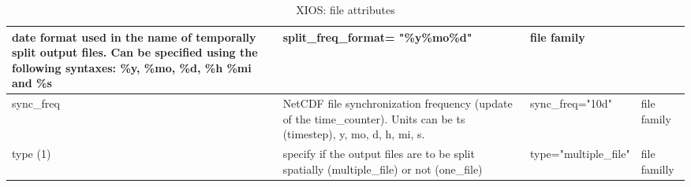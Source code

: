 \documentclass[../main/NEMO_manual]{subfiles}
\begin{document}
\begin{table}
\begin{tabularx}{\textwidth}{|l|X|l|l|}
    date format used in the name of temporally split output files.
    Can be specified using the following syntaxes: \%y, \%mo, \%d, \%h \%mi and \%s                      &
    split\_freq\_format= "\%y\%mo\%d"                                                                    &
    file family                            \\
    \hline
    sync\_freq                                                                                           &
    NetCDF file synchronization frequency (update of the time\_counter).
    Units can be ts (timestep), y, mo, d, h, mi, s.                                                      &
    sync\_freq="10d"                                                                                     &
    file family                            \\
    \hline
    type (1)                                                                                             &
    specify if the output files are to be split spatially (multiple\_file) or not (one\_file)            &
    type="multiple\_file"                                                                                &
    file familly                           \\
    \hline
  \end{tabularx}
  \caption{XIOS: file attributes}
\end{table}
\end{document}

